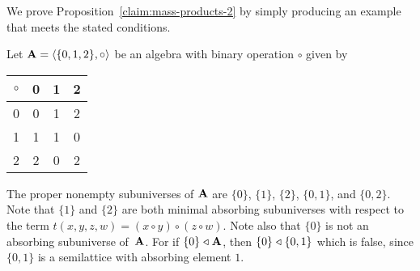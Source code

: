 \noindent We prove Proposition~\ref{claim:mass-products-2} by simply producing 
an example that meets the stated conditions.

\begin{example}
  \label{ex:mass-products-3}
Let $\mathbf{A} = \langle\{0,1,2\}, \circ\rangle$ be an algebra with binary operation $\circ$
given by
\vskip3mm
 \begin{center}
 \begin{tabular}{c|ccc}
      $\circ$ & 0 & 1 & 2 \\
      \hline
      0 & 0 & 1 & 2\\
      1 & 1 & 1 & 0\\
      2 & 2 & 0 & 2
    \end{tabular}
 \end{center}
\vskip3mm
The proper nonempty subuniverses of
$\mathbf{A}$ are $\{0\}$, $\{1\}$, $\{2\}$, $\{0,1\}$, and $\{0,2\}$.
Note that %
$\{1\}$ and $\{2\}$ are both minimal absorbing subuniverses with respect to the
term $t(x,y,z,w) = (x \circ y) \circ (z \circ w)$. 
Note also that $\{0\}$ is not an absorbing subuniverse of~$\mathbf{A}$. For if
$\{0\}\mathrel{\triangleleft} \mathbf{A}$, then
$\{0\}\mathrel{\triangleleft} \{0,1\}$ which is  false, since $\{0,1\}$ is a semilattice with
absorbing element $1$.  


\end{example}
